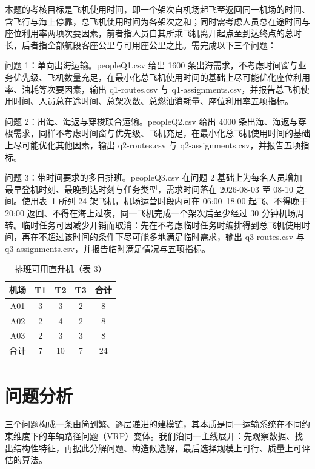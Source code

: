 \documentclass[UTF8,zihao=-4]{ctexart}
\numberwithin{figure}{section}
\numberwithin{table}{section}
\begin{document}
本题的考核目标是飞机使用时间，即一个架次自机场起飞至返回同一机场的时间、含飞行与海上停靠，总飞机使用时间为各架次之和；同时需考虑人员总在途时间与座位利用率两项次要因素，前者指人员自其所乘飞机离开起点至到达终点的总时长，后者指全部航段客座公里与可用座公里之比。需完成以下三个问题：

问题 1：单向出海运输。peopleQ1.csv 给出 1600 条出海需求，不考虑时间窗与业务优先级、飞机数量充足，在最小化总飞机使用时间的基础上尽可能优化座位利用率、油耗等次要因素，输出 q1-routes.csv 与 q1-assignments.csv，并报告总飞机使用时间、人员总在途时间、总架次数、总燃油消耗量、座位利用率五项指标。

问题 2：出海、海返与穿梭联合运输。peopleQ2.csv 给出 4000 条出海、海返与穿梭需求，同样不考虑时间窗与优先级、飞机充足，在最小化总飞机使用时间的基础上尽可能优化其他因素，输出 q2-routes.csv 与 q2-assignments.csv，并报告五项指标。

问题 3：带时间要求的多日排班。peopleQ3.csv 在问题 2 基础上为每名人员增加最早登机时刻、最晚到达时刻与任务类型，需求时间落在 2026-08-03 至 08-10 之间。使用表~\ref{tab:fleet} 所列 24 架飞机，机场运营时段内可在 06:00--18:00 起飞、不得晚于 20:00 返回、不得在海上过夜，同一飞机完成一个架次后至少经过 30 分钟机场周转。临时任务可因减少开销而取消：先在不考虑临时任务时编排得到总飞机使用时间，再在不超过该时间的条件下尽可能多地满足临时需求，输出 q3-routes.csv 与 q3-assignments.csv，并报告临时满足情况与五项指标。

\begin{table}[H]
  \centering
  \caption{排班可用直升机（表 3）}
  \label{tab:fleet}
  \begin{tabular}{ccccc}
    \toprule
    机场 & T1 & T2 & T3 & 合计 \\
    \midrule
    A01 & 3 & 3 & 2 & 8 \\
    A02 & 2 & 4 & 2 & 8 \\
    A03 & 2 & 3 & 3 & 8 \\
    \midrule
    合计 & 7 & 10 & 7 & 24 \\
    \bottomrule
  \end{tabular}
\end{table}

\section{问题分析}

三个问题构成一条由简到繁、逐层递进的建模链，其本质是同一运输系统在不同约束维度下的车辆路径问题（VRP）变体。我们沿同一主线展开：先观察数据、找出结构性特征，再据此分解问题、构造候选解，最后选择规模上可行、质量上可评估的算法。
\end{document}
